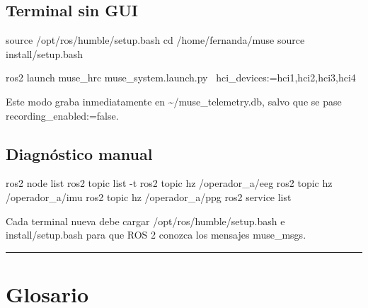 \documentclass[11pt,a4paper]{article}
\begin{document}
\subsection{Terminal sin GUI}

\begin{MuseCode}
source /opt/ros/humble/setup.bash
cd /home/fernanda/muse
source install/setup.bash

ros2 launch muse_hrc muse_system.launch.py \
  hci_devices:=hci1,hci2,hci3,hci4
\end{MuseCode}

Este modo graba inmediatamente en {\ttfamily\small \textasciitilde{}/muse\_telemetry.db}, salvo que se pase {\ttfamily\small recording\_enabled:=false}.

\subsection{Diagnóstico manual}

\begin{MuseCode}
ros2 node list
ros2 topic list -t
ros2 topic hz /operador_a/eeg
ros2 topic hz /operador_a/imu
ros2 topic hz /operador_a/ppg
ros2 service list
\end{MuseCode}

Cada terminal nueva debe cargar {\ttfamily\small /opt/ros/humble/setup.bash} e {\ttfamily\small install/setup.bash} para que ROS 2 conozca los mensajes {\ttfamily\small muse\_msgs}.

\medskip\hrule\medskip

\section{Glosario}
\end{document}
